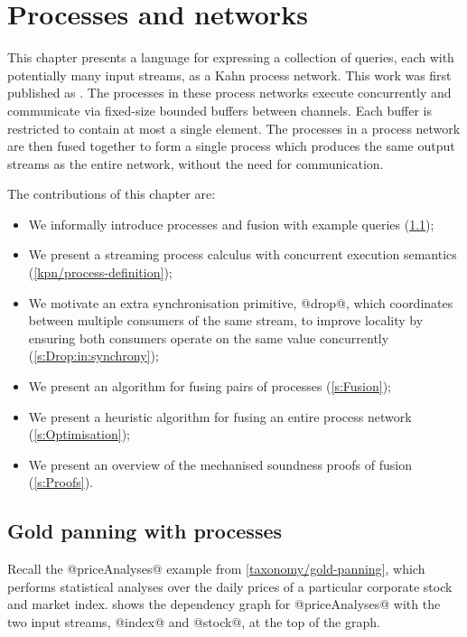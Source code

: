 \chapter{Processes and networks}
\label{chapter:process:processes}

This chapter presents a language for expressing a collection of queries, each with potentially many input streams, as a Kahn process network.
This work was first published as \citet{robinson2017machine}.
The processes in these process networks execute concurrently and communicate via fixed-size bounded buffers between channels.
Each buffer is restricted to contain at most a single element.
The processes in a process network are then fused together to form a single process which produces the same output streams as the entire network, without the need for communication.

The contributions of this chapter are:
\begin{itemize}
\item
We informally introduce processes and fusion with example queries (\cref{kpn/gold-panning});
\item
We present a streaming process calculus with concurrent execution semantics (\cref{kpn/process-definition});
\item
We motivate an extra synchronisation primitive, @drop@, which coordinates between multiple consumers of the same stream, to improve locality by ensuring both consumers operate on the same value concurrently
(\cref{s:Drop:in:synchrony});
\item
We present an algorithm for fusing pairs of processes (\cref{s:Fusion});
\item
We present a heuristic algorithm for fusing an entire process network (\cref{s:Optimisation});
\item
We present an overview of the mechanised soundness proofs of fusion (\cref{s:Proofs}).
\end{itemize}



\section{Gold panning with processes}
\label{kpn/gold-panning}
Recall the @priceAnalyses@ example from \cref{taxonomy/gold-panning}, which performs statistical analyses over the daily prices of a particular corporate stock and market index.
 shows the dependency graph for @priceAnalyses@ with the two input streams, @index@ and @stock@, at the top of the graph.

